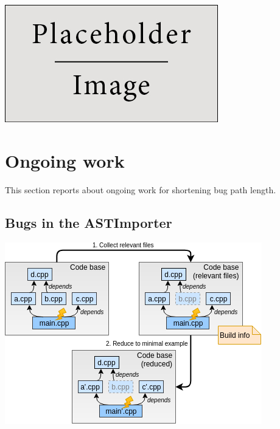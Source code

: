 \documentclass[a0,portrait]{a0poster}
\begin{document}
\begin{multicols}{2}
\begin{center}\vspace{1cm}
\includegraphics[width=0.8\linewidth]{placeholder}
\end{center}\vspace{1cm}


\section*{Ongoing work}

This section reports about ongoing work for shortening bug path length. 


\subsection*{Bugs in the ASTImporter}

\begin{center}\vspace{1cm}
\includegraphics[width=0.8\linewidth]{reducing_process}
\label{fig:reducing-process}
\end{center}\vspace{1cm}


\end{multicols}
\end{document}

